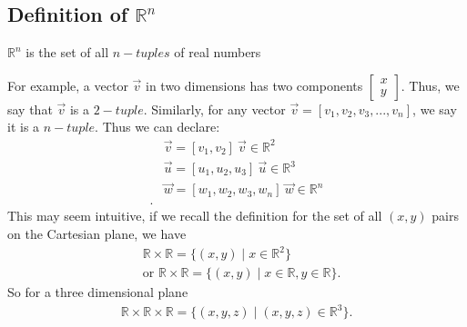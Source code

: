 \documentclass{report}
\begin{document}
    \subsection{Definition of $\mathbb{R}^{n}$}
    \bigbreak \noindent 
    \begin{definition}
       $\mathbb{R}^{n}$ is the set of all $n-tuples$ of real numbers  
    \end{definition}
    \bigbreak \noindent 
    For example, a vector $\vec{v}$ in two dimensions has two components $\begin{bmatrix} x \\ y\end{bmatrix}$. Thus, we say that $\vec{v}$ is a $2-tuple$. Similarly, for any vector $\vec{v} = [v_{1}, v_{2}, v_{3},...,v_{n}]$, we say it is a $n-tuple$. Thus we can declare:
    \begin{align*}
        &\vec{v} = [v_{1}, v_{2}]\ \vec{v} \in \mathbb{R}^{2} \\
        &\vec{u} = [u_{1}, u_{2},u_{3}]\ \vec{u} \in \mathbb{R}^{3} \\
        &\vec{w} = [w_{1}, w_{2},w_{3}, w_{n}]\ \vec{w} \in \mathbb{R}^{n} \\
    .\end{align*}
    \bigbreak \noindent 
    This may seem intuitive, if we recall the definition for the set of all $(x,y)$ pairs on the Cartesian plane, we have
    \begin{align*}
        &\mathbb{R} \times \mathbb{R} = \{(x,y) \mid x \in \mathbb{R}^{2}\} \\
        &\text{or }\mathbb{R} \times \mathbb{R} = \{(x,y) \mid x \in \mathbb{R}, y \in \mathbb{R}\}
    .\end{align*}
    \bigbreak \noindent 
    So for a three dimensional plane
    \begin{align*}
        \mathbb{R} \times \mathbb{R} \times \mathbb{R} = \{(x,y,z) \mid (x,y,z) \in \mathbb{R}^{3}\}
    .\end{align*}
    

    
    
\end{document}

